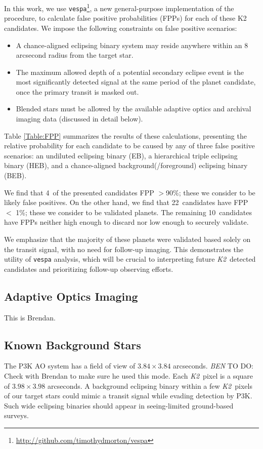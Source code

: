 \documentclass{emulateapj}
\newcommand{\project}[1]{\textsl{#1}}
\newcommand{\KT}{\project{K2}}
\newcommand{\todo}[3]{{\color{#2} \emph{#1} TO DO: #3}}
\newcommand{\btmtodo}[1]{\todo{BEN}{red}{#1}}
\newcommand{\Nfp}{4}
\newcommand{\Nvalidated}{22}
\newcommand{\Nlimbo}{10} %
\begin{document}
In this work, we use
\texttt{vespa}\footnote{\url{http://github.com/timothydmorton/vespa}},
a new general-purpose implementation of the \citet{Morton12} procedure, 
to calculate false positive probabilities (FPPs) for each of these 
K2 candidates.  We impose the following constraints on false positive
scenarios:
\begin{itemize}
\item A chance-aligned eclipsing binary system may reside anywhere within
an 8 arcsecond radius from the target star.
\item The maximum allowed depth of a potential secondary eclipse event
is the most significantly detected signal at the same
period of the planet candidate, once the primary transit is masked out.
\item Blended stars must be allowed by the available adaptive optics
and archival imaging data (discussed in detail below).
\end{itemize}

Table \ref{Table:FPP} summarizes the results of these
calculations, presenting the relative probability for each candidate
to be caused by any of three false positive scenarios: an undiluted
eclipsing binary (EB), a hierarchical triple eclipsing binary (HEB),
and a chance-aligned background(/foreground) eclipsing binary (BEB).

We find that \Nfp\ of the presented candidates FPP $>$90\%;
these we consider to be likely false positives.
On the other hand, we find that \Nvalidated\ candidates
have FPP $<$ 1\%; these we consider to be validated planets.
The remaining \Nlimbo\ candidates have FPPs neither high enough to discard
nor low enough to securely validate.

We emphasize that the majority of these planets were validated based 
solely on the transit signal, with no need for follow-up imaging.  This
demonstrates the utility of \texttt{vespa} analysis, which will be
crucial to interpreting future \KT\ detected candidates and prioritizing
follow-up observing efforts.

\subsection{Adaptive Optics Imaging}

This is Brendan.




\subsection{Known Background Stars}
The P3K AO system has a field of view of $3.84 \times 3.84$ arcseconds.
\btmtodo{Check with Brendan to make sure he used this mode}.
Each \KT\ pixel is a square of $3.98 \times 3.98$ arcseconds.
A background eclipsing binary within a few \KT\ pixels of our target
stars could mimic a transit signal while evading detection by P3K.
Such wide eclipsing binaries should appear in seeing-limited ground-based
surveys.
\end{document}
